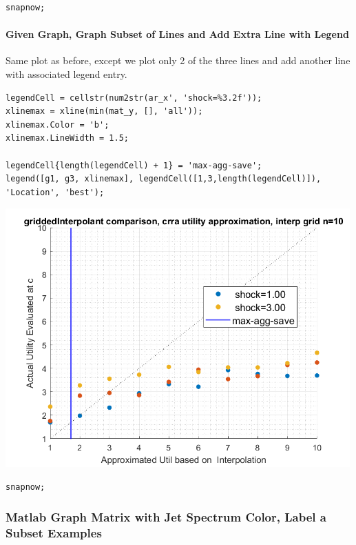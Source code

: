 \documentclass[
]{book}
\begin{document}
\begin{verbatim}
snapnow;
\end{verbatim}

\hypertarget{given-graph-graph-subset-of-lines-and-add-extra-line-with-legend}{%
\paragraph{Given Graph, Graph Subset of Lines and Add Extra Line with Legend}\label{given-graph-graph-subset-of-lines-and-add-extra-line-with-legend}}

Same plot as before, except we plot only 2 of the three lines and add
another line with associated legend entry.

\begin{verbatim}
legendCell = cellstr(num2str(ar_x', 'shock=%3.2f'));
xlinemax = xline(min(mat_y, [], 'all'));
xlinemax.Color = 'b';
xlinemax.LineWidth = 1.5;

legendCell{length(legendCell) + 1} = 'max-agg-save';
legend([g1, g3, xlinemax], legendCell([1,3,length(legendCell)]), 'Location', 'best');
\end{verbatim}

\includegraphics[width=5.20833in,height=\textheight]{img/fs_titling_images/figure_2.png}

\begin{verbatim}
snapnow;
\end{verbatim}

\hypertarget{matlab-graph-matrix-with-jet-spectrum-color-label-a-subset-examples}{%
\subsubsection{Matlab Graph Matrix with Jet Spectrum Color, Label a Subset Examples}\label{matlab-graph-matrix-with-jet-spectrum-color-label-a-subset-examples}}
\end{document}
